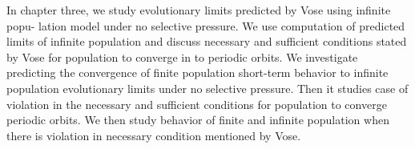 In chapter three, we study evolutionary limits predicted by Vose using infinite popu-
lation model under no selective pressure. We use computation of predicted limits
of infinite population and discuss necessary and sufficient conditions stated by Vose for population
to converge in to periodic orbits. We investigate predicting the convergence of finite population short-term behavior to infinite population evolutionary limits under no selective pressure. Then it studies case of violation in the necessary and sufficient conditions for population to converge periodic orbits. We then study behavior of finite and infinite population when there is violation in necessary condition mentioned by Vose.







